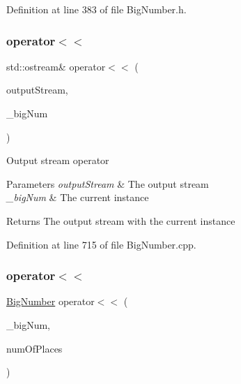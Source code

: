 Definition at line 383 of file Big\+Number.\+h.

\mbox{\label{class_big_nums_1_1_big_number_a47e2ad103bf98d5fecb7a0ff01d36e60}} 
\subsubsection{\texorpdfstring{operator$<$$<$}{operator<<}\hspace{0.1cm}{\footnotesize\ttfamily [1/2]}}
{\footnotesize\ttfamily std\+::ostream\& operator$<$$<$ (\begin{DoxyParamCaption}\item[{std\+::ostream \&}]{output\+Stream,  }\item[{const \mbox{\hyperlink{class_big_nums_1_1_big_number}{Big\+Number}} \&}]{\+\_\+big\+Num }\end{DoxyParamCaption})\hspace{0.3cm}{\ttfamily [friend]}}

Output stream operator 
\begin{DoxyParams}{Parameters}
{\em output\+Stream} & The output stream \\
\hline
{\em \+\_\+big\+Num} & The current instance \\
\hline
\end{DoxyParams}
\begin{DoxyReturn}{Returns}
The output stream with the current instance 
\end{DoxyReturn}


Definition at line 715 of file Big\+Number.\+cpp.

\mbox{\label{class_big_nums_1_1_big_number_ab6d6f57915676119fc27d509ffbc7aaa}} 
\subsubsection{\texorpdfstring{operator$<$$<$}{operator<<}\hspace{0.1cm}{\footnotesize\ttfamily [2/2]}}
{\footnotesize\ttfamily \mbox{\hyperlink{class_big_nums_1_1_big_number}{Big\+Number}} operator$<$$<$ (\begin{DoxyParamCaption}\item[{const \mbox{\hyperlink{class_big_nums_1_1_big_number}{Big\+Number}} \&}]{\+\_\+big\+Num,  }\item[{int}]{num\+Of\+Places }\end{DoxyParamCaption})\hspace{0.3cm}{\ttfamily [friend]}}

